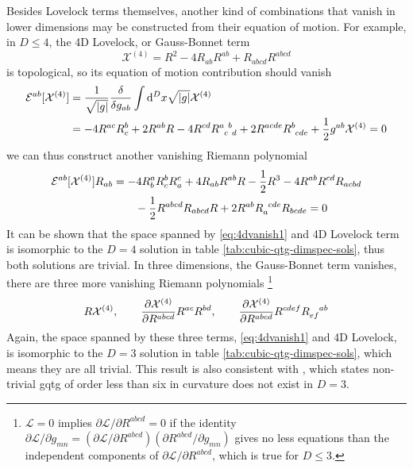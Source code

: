 \documentclass[a4paper,11pt]{article}
\newcommand{\dd}{{\mathrm d}}
\begin{document}
Besides Lovelock terms themselves, another kind of combinations that vanish in lower dimensions may be constructed from their equation of motion. For example, in $D \leqslant 4$, the 4D Lovelock, or Gauss-Bonnet term
\begin{equation}
    \mathcal X^{(4)} = R^2 - 4R_{ab}R^{ab} + R_{abcd}R^{abcd}
\end{equation}
is topological, so its equation of motion contribution should vanish
\begin{align}
    \mathcal E^{ab}[\mathcal X^{(4)}] & = \frac{1}{\sqrt{|g|}}\frac{\delta}{\delta g_{ab}}\int\dd^D x\sqrt{|g|}\mathcal X^{(4)}\nonumber\\
    & = -4 R^{ac} R^b_c + 2 R^{ab}R - 4R^{cd}R\indices{^a_c^b_d} + 2R^{acde} R\indices{^b_c_d_e} + \frac12 g^{ab} \mathcal X^{(4)} = 0
\end{align}
we can thus construct another vanishing Riemann polynomial
\begin{align}\label{eq:4dvanish1}
    \mathcal E^{ab}[\mathcal X^{(4)}] R_{ab} & = -4R^a_b R^b_c R^c_a + 4R_{ab}R^{ab}R - \frac12 R^3 - 4R^{ab} R^{cd}R_{acbd}\nonumber\\
    & \qquad - \frac12 R^{abcd}R_{abcd}R + 2R^{ab}R\indices{_a^c^d^e}R_{bcde} = 0
\end{align}
It can be shown that the space spanned by \eqref{eq:4dvanish1} and 4D Lovelock term is isomorphic to the $D = 4$ solution in table \ref{tab:cubic-qtg-dimspec-sols}, thus both solutions are trivial. In three dimensions, the Gauss-Bonnet term vanishes, there are three more vanishing Riemann polynomials \footnote{$\mathcal L = 0$ implies $\partial\mathcal L / \partial R^{abcd} = 0$ if the identity $\partial\mathcal L / \partial g_{mn} = (\partial\mathcal L / \partial R^{abcd}) (\partial R^{abcd} / \partial g_{mn})$ gives no less equations than the independent components of $\partial\mathcal L / \partial R^{abcd}$, which is true for $D \leqslant 3$.}
\begin{equation}\label{eq:3dvanishing-terms}
    R \mathcal X^{(4)}, \qquad \frac{\partial\mathcal X^{(4)}}{\partial R^{abcd}} R^{ac} R^{bd},
    \qquad \frac{\partial\mathcal X^{(4)}}{\partial R^{abcd}} R^{cdef} R\indices{_e_f^a^b}
\end{equation}
Again, the space spanned by these three terms, \eqref{eq:4dvanish1} and 4D Lovelock, is isomorphic to the $D = 3$ solution in table \ref{tab:cubic-qtg-dimspec-sols}, which means they are all trivial. This result is also consistent with \cite{aspects-of-3d-higher-grav}, which states non-trivial \ac{gqtg} of order less than six in curvature does not exist in $D = 3$.
\end{document}
